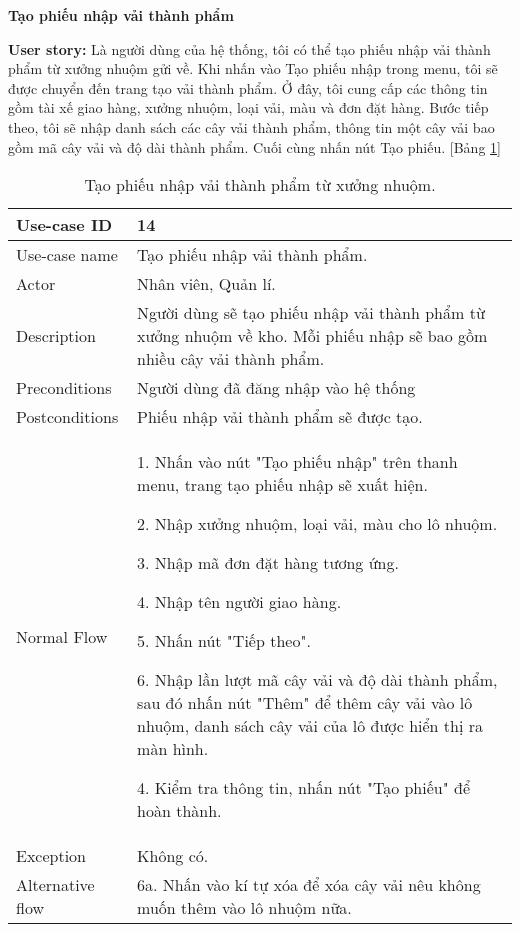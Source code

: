 \textbf{Tạo phiếu nhập vải thành phẩm}\par
\textbf{User story:} Là người dùng của hệ thống, tôi có thể tạo phiếu nhập vải thành phẩm từ xưởng nhuộm gửi về. Khi nhấn vào Tạo phiếu nhập trong menu, tôi sẽ được chuyển đến trang tạo vải thành phẩm. Ở đây, tôi cung cấp các thông tin gồm tài xế giao hàng, xưởng nhuộm, loại vải, màu và đơn đặt hàng. Bước tiếp theo, tôi sẽ nhập danh sách các cây vải thành phẩm, thông tin một cây vải bao gồm mã cây vải và độ dài thành phẩm. Cuối cùng nhấn nút Tạo phiếu. [Bảng \ref{bang11}]
\begin{table}[H]
    \centering
    \begin{tabular}{|m{3cm}|m{10cm}|}
    \hline 
        Use-case ID & 14\\ \hline
        Use-case name & Tạo phiếu nhập vải thành phẩm.\\ \hline
        Actor & Nhân viên, Quản lí.\\ \hline
        Description & Người dùng sẽ tạo phiếu nhập vải thành phẩm từ xưởng nhuộm về kho. Mỗi phiếu nhập sẽ bao gồm nhiều cây vải thành phẩm.\\ \hline
        Preconditions & Người dùng đã đăng nhập vào hệ thống \\ \hline
        Postconditions & Phiếu nhập vải thành phẩm sẽ được tạo.\\ \hline
        Normal Flow & 
        1. Nhấn vào nút "Tạo phiếu nhập" trên thanh menu, trang tạo phiếu nhập sẽ xuất hiện.\par
        2. Nhập xưởng nhuộm, loại vải, màu cho lô nhuộm.\par
        3. Nhập mã đơn đặt hàng tương ứng.\par
        4. Nhập tên người giao hàng.\par
        5. Nhấn nút "Tiếp theo".\par
        6. Nhập lần lượt mã cây vải và độ dài thành phẩm, sau đó nhấn nút "Thêm" để thêm cây vải vào lô nhuộm, danh sách cây vải của lô được hiển thị ra màn hình.\par
        4. Kiểm tra thông tin, nhấn nút "Tạo phiếu" để hoàn thành.
        \\ \hline
        Exception & Không có.
        \\ \hline
        Alternative flow & 
        6a. Nhấn vào kí tự xóa để xóa cây vải nêu không muốn thêm vào lô nhuộm nữa.
        \\ 
    \hline 
    \end{tabular}
    \caption{Tạo phiếu nhập vải thành phẩm từ xưởng nhuộm.}
    \label{bang11}
\end{table}


